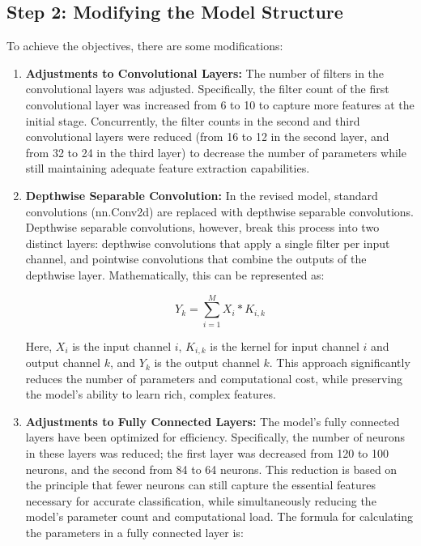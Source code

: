 \documentclass[conference]{IEEEtran}
\begin{document}
	\subsection{Step 2: Modifying the Model Structure}
	To achieve the objectives, there are some modifications:
	\begin{enumerate}
		\item \textbf{Adjustments to Convolutional Layers:}
		The number of filters in the convolutional layers was adjusted. Specifically, the filter count of the first convolutional layer was increased from 6 to 10 to capture more features at the initial stage. Concurrently, the filter counts in the second and third convolutional layers were reduced (from 16 to 12 in the second layer, and from 32 to 24 in the third layer) to decrease the number of parameters while still maintaining adequate feature extraction capabilities.
		
		\item \textbf{Depthwise Separable Convolution:}
		In the revised model, standard convolutions (nn.Conv2d) are replaced with depthwise separable convolutions. Depthwise separable convolutions, however, break this process into two distinct layers: depthwise convolutions that apply a single filter per input channel, and pointwise convolutions that combine the outputs of the depthwise layer. Mathematically, this can be represented as:
		
		\begin{equation}
			Y_{k} = \sum_{i=1}^{M} X_i * K_{i,k}
		\end{equation}
		
		Here, \(X_i\) is the input channel \(i\), \(K_{i,k}\) is the kernel for input channel \(i\) and output channel \(k\), and \(Y_{k}\) is the output channel \(k\). This approach significantly reduces the number of parameters and computational cost, while preserving the model's ability to learn rich, complex features.
		
		\item \textbf{Adjustments to Fully Connected Layers:}
		The model's fully connected layers have been optimized for efficiency. Specifically, the number of neurons in these layers was reduced; the first layer was decreased from 120 to 100 neurons, and the second from 84 to 64 neurons. This reduction is based on the principle that fewer neurons can still capture the essential features necessary for accurate classification, while simultaneously reducing the model's parameter count and computational load. The formula for calculating the parameters in a fully connected layer is:
		

\end{enumerate}
\end{document}
